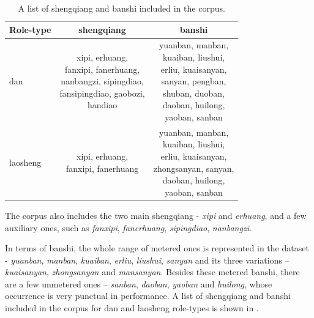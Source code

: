 \begin{table}[ht]
    \centering
    \caption{A list of shengqiang and banshi included in the corpus.}
    \label{table:ch4:shengqiang_banshi_corpus}
    \begin{tabular}{l|cc}
        \toprule
        Role-type & shengqiang & banshi \\
        \midrule
        dan           & \makecell{xipi, erhuang,\\fanxipi, fanerhuang,\\nanbangzi, sipingdiao,\\fansipingdiao, gaobozi,\\handiao} & \makecell{yuanban, manban,\\kuaiban, liushui,\\erliu, kuaisanyan,\\sanyan, pengban,\\shuban, duoban,\\daoban, huilong,\\yaoban, sanban} \\
	    \hline
	    laosheng      & \makecell{xipi, erhuang,\\fanxipi, fanerhuang} & \makecell{yuanban, manban,\\kuaiban, liushui,\\erliu, kuaisanyan,\\zhongsanyan, sanyan,\\daoban, huilong,\\yaoban, sanban} \\
        \bottomrule
    \end{tabular}
\end{table}

The corpus also includes the two main \gls{shengqiang} - \textit{xipi} and \textit{erhuang}, and a few auxiliary ones, such as \textit{fanxipi}, \textit{fanerhuang}, \textit{sipingdiao}, \textit{nanbangzi}.

In terms of \gls{banshi}, the whole range of metered ones is represented in the dataset - \textit{yuanban}, \textit{manban}, \textit{kuaiban}, \textit{erliu}, \textit{liushui}, \textit{sanyan} and its three variations -- \textit{kuaisanyan}, \textit{zhongsanyan} and \textit{mansanyan}. Besides these metered \gls{banshi}, there are a few unmetered ones -- \textit{sanban}, \textit{daoban}, \textit{yaoban} and \textit{huilong}, whose occurrence is very punctual in performance. A list of \gls{shengqiang} and \gls{banshi} included in the corpus for \gls{dan} and \gls{laosheng} role-types is shown in .

